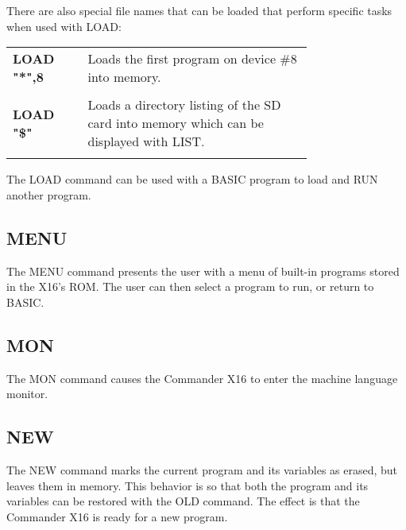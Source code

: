 There are also special file names that can be loaded that perform specific
tasks when used with {\ttfamily LOAD}:\\

\begin{tabular}{l p{0.75\linewidth}}

	{\ttfamily\bfseries LOAD "*",8}&Loads the first program on device \#8 into
	memory.\\\\

	{\ttfamily\bfseries LOAD "\$"}&Loads a directory listing of the SD card
	into memory which can be displayed with {\ttfamily LIST}.\\\\

\end{tabular}

\vspace{16pt}

The {\ttfamily LOAD} command can be used with a BASIC program to load and
{\ttfamily RUN} another program.\\

\subsection{MENU}

The {\ttfamily MENU} command presents the user with a menu of built-in programs
stored in the X16's ROM.  The user can then select a program to run, or return
to BASIC.\\

\subsection{MON}

The {\ttfamily MON} command causes the Commander X16 to enter the machine
language monitor.\\

\subsection{NEW} 

The {\ttfamily NEW} command marks the current program and its variables as
erased, but leaves them in memory.  This behavior is so that both the program
and its variables can be restored with the {\ttfamily OLD} command.  The effect
is that the Commander X16 is ready for a new program.\\

